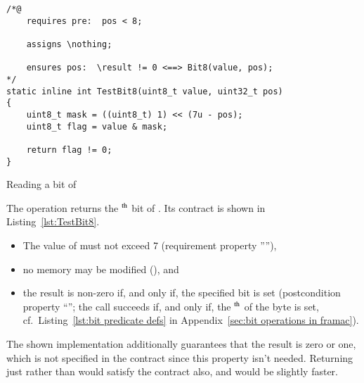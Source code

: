 \begin{listing}[hbt]
\begin{minipage}{0.99\textwidth}
\begin{lstlisting}[style=acsl-block]
/*@
    requires pre:  pos < 8;

    assigns \nothing;

    ensures pos:  \result != 0 <==> Bit8(value, pos);
*/
static inline int TestBit8(uint8_t value, uint32_t pos)
{
    uint8_t mask = ((uint8_t) 1) << (7u - pos);
    uint8_t flag = value & mask;

    return flag != 0;
}
\end{lstlisting}
\end{minipage}
\caption{\label{lst:TestBit8}Reading a bit of }
\end{listing}










The operation  returns the
$^{\mbox{\scriptsize th}}$
bit of .
%
Its contract is shown in Listing~\ref{lst:TestBit8}.
%
\begin{itemize}
\item The value of  must not exceed 7 
	(requirement property ''''),
\item no memory may be modified (), and 
\item the result is non-zero if, and only
	if, the specified bit is set (postcondition property
	``''; the call  succeeds 
	if, and only if, the $^{\mbox{\scriptsize th}}$ of
	the byte  is set, 
	cf.\ Listing~\ref{lst:bit predicate defs} in
	Appendix~\ref{sec:bit operations in framac}).
\end{itemize}
%
The shown implementation additionally guarantees that the result is
zero or one, which
is not specified in the contract since this property isn't needed.
%
Returning just  rather than 
would satisfy the
contract also, and would be slightly faster.






